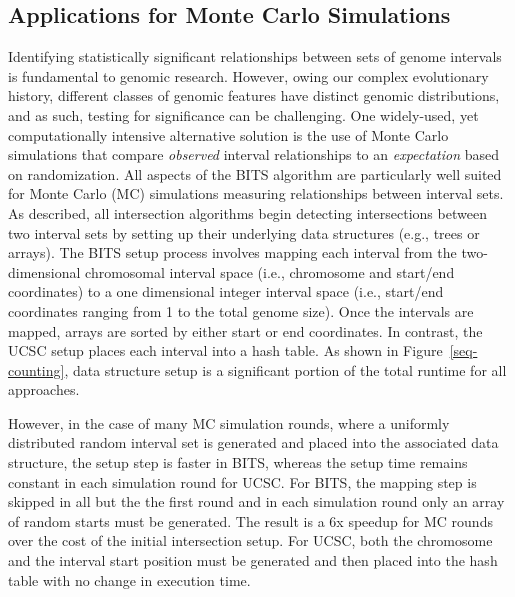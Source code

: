 \documentclass{bioinfo}
\begin{document}
\subsection{Applications for Monte Carlo Simulations}

Identifying statistically significant relationships between sets of genome
intervals is fundamental to genomic research. However, owing our complex 
evolutionary history, different classes of genomic features have distinct
genomic distributions, and as such, testing for significance can be challenging. 
One widely-used, yet computationally intensive alternative solution is the 
use of Monte Carlo simulations that compare \emph{observed} interval 
relationships to an \emph{expectation} based on randomization. 
All aspects of the BITS algorithm are particularly well suited for Monte Carlo
(MC) simulations measuring relationships between interval sets. As described,
all intersection algorithms begin detecting intersections between two interval
sets by setting up their underlying data structures (e.g., trees or arrays). The 
BITS setup process
involves mapping each interval from the two-dimensional chromosomal interval
space (i.e., chromosome and start/end coordinates) to a one dimensional integer
interval space (i.e., start/end coordinates ranging from 1 to the total genome
size). Once the intervals are mapped, arrays are sorted by either start or
end coordinates.  In contrast, the UCSC setup places each interval into a hash 
table.  As shown in Figure~\ref{seq-counting}, data
structure setup is a significant portion of the total runtime for all
approaches. 

However, in the case of many MC simulation rounds, where a uniformly distributed
random interval set is generated and placed into the associated data structure,
the setup step is faster in BITS, whereas the setup time remains constant in
each simulation round for UCSC.  For BITS, the mapping step is skipped in all
but the the first round and in each simulation round only an array of random
starts must be generated. The result is a 6x speedup for MC rounds over the
cost of the initial intersection setup.  For UCSC, both the chromosome and the
interval start position must be generated and then placed into the hash table
with no change in execution time.
\end{document}
